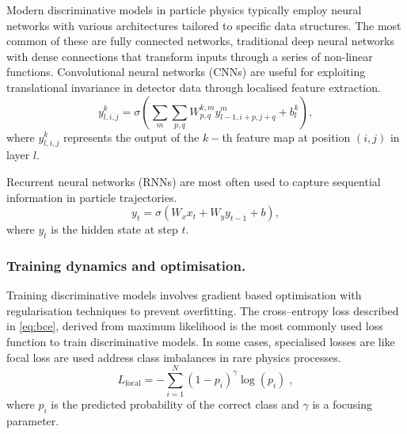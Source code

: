             Modern discriminative models in particle physics typically employ neural networks with various architectures tailored to specific data structures.
            The most common of these are fully connected networks, traditional deep neural networks with dense connections that transform inputs through a series of non-linear functions.
            Convolutional neural networks (CNNs) are useful for exploiting translational invariance in detector data through localised feature extraction.
            \begin{equation}
                y_{l,i,j}^k = \sigma\left(\sum_{m}\sum_{p,q} W_{p,q}^{k,m} y_{l-1,i+p,j+q}^m + b_l^k\right),
            \end{equation}
            where \(y_{l,i,j}^k\) represents the output of the \(k-\)th feature map at position \((i,j)\) in layer \(l\).
            
            Recurrent neural networks (RNNs) are most often used to capture sequential information in particle trajectories.
            \begin{equation}
                y_t = \sigma(W_x x_t + W_y y_{t-1} + b),
            \end{equation}
            where \(y_t\) is the hidden state at step \(t\).
        
            \subsubsection{Training dynamics and optimisation.}
            
                Training discriminative models involves gradient based optimisation with regularisation techniques to prevent overfitting.
                The cross--entropy loss described in \cref{eq:bce}, derived from maximum likelihood is the most commonly used loss function to train discriminative models.
                In some cases, specialised losses are like focal loss are used address class imbalances in rare physics processes.
                \begin{equation}
                    L_{\text{focal}} = -\sum_{i=1}^N (1-p_i)^\gamma \log(p_i)\;,
                \end{equation}
                where \(p_i\) is the predicted probability of the correct class and \(\gamma\) is a focusing parameter.
    
